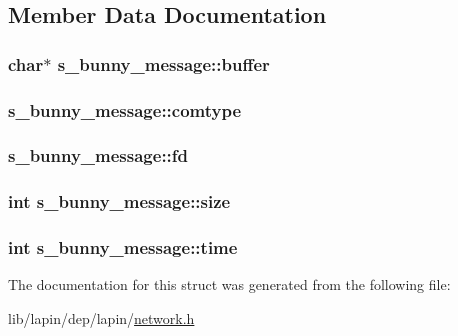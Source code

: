 \subsection{Member Data Documentation}
\hypertarget{structs__bunny__message_a2d8d242384d65fa193194743592455ff}{
\subsubsection[{buffer}]{ char$\ast$ s\-\_\-bunny\-\_\-message\-::buffer}}\label{structs__bunny__message_a2d8d242384d65fa193194743592455ff}
\hypertarget{structs__bunny__message_aac3f30ea75b4f7dad91d75ce0e1053a5}{
\subsubsection[{comtype}]{ s\-\_\-bunny\-\_\-message\-::comtype}}\label{structs__bunny__message_aac3f30ea75b4f7dad91d75ce0e1053a5}
\hypertarget{structs__bunny__message_acbb365092fc8dbdca461f03cf5a6309e}{
\subsubsection[{fd}]{ s\-\_\-bunny\-\_\-message\-::fd}}\label{structs__bunny__message_acbb365092fc8dbdca461f03cf5a6309e}
\hypertarget{structs__bunny__message_a45c5feb6cd96bd3408b2358d907e0218}{
\subsubsection[{size}]{ {\bf int} s\-\_\-bunny\-\_\-message\-::size}}\label{structs__bunny__message_a45c5feb6cd96bd3408b2358d907e0218}
\hypertarget{structs__bunny__message_ab5658ada85598e95b40996a587aa971d}{
\subsubsection[{time}]{ {\bf int} s\-\_\-bunny\-\_\-message\-::time}}\label{structs__bunny__message_ab5658ada85598e95b40996a587aa971d}


The documentation for this struct was generated from the following file\-:\begin{DoxyCompactItemize}
\item 
lib/lapin/dep/lapin/\hyperlink{network_8h}{network.\-h}\end{DoxyCompactItemize}
